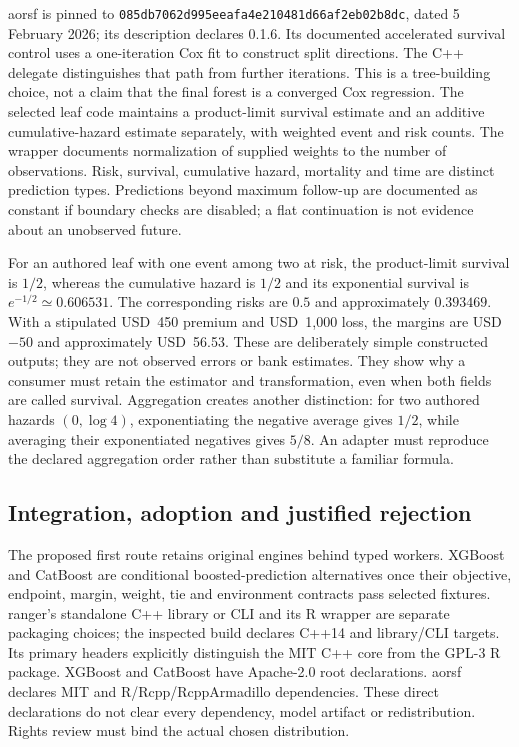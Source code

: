 aorsf is pinned to
\texttt{085db7062d995eeafa4e210481d66af2eb02b8dc}, dated 5 February
2026; its description declares 0.1.6. Its documented accelerated survival
control uses a one-iteration Cox fit to construct split directions. The C++
delegate distinguishes that path from further iterations. This is a tree-building
choice, not a claim that the final forest is a converged Cox regression.
The selected leaf code maintains a product-limit survival estimate and an
additive cumulative-hazard estimate separately, with weighted event and risk
counts. The wrapper documents normalization of supplied weights to the number
of observations. Risk, survival, cumulative hazard, mortality and time are
distinct prediction types. Predictions beyond maximum follow-up are documented
as constant if boundary checks are disabled; a flat continuation is not evidence
about an unobserved future.\citep{exec24_longcxx_aorsf}

For an authored leaf with one event among two at risk, the product-limit
survival is $1/2$, whereas the cumulative hazard is $1/2$ and its exponential
survival is $e^{-1/2}\simeq0.606531$. The corresponding risks are $0.5$ and
approximately $0.393469$. With a stipulated USD~450 premium and USD~1,000 loss,
the margins are USD~$-50$ and approximately USD~56.53. These are deliberately
simple constructed outputs; they are not observed errors or bank estimates.
They show why a consumer must retain the estimator and transformation, even
when both fields are called survival. Aggregation creates another distinction:
for two authored hazards $(0,\log4)$, exponentiating the negative average gives
$1/2$, while averaging their exponentiated negatives gives $5/8$. An adapter
must reproduce the declared aggregation order rather than substitute a familiar
formula.\citep{exec24_longcxx_reference}

\subsection{Integration, adoption and justified rejection}

The proposed first route retains original engines behind typed workers. XGBoost
and CatBoost are conditional boosted-prediction alternatives once their objective,
endpoint, margin, weight, tie and environment contracts pass selected fixtures.
ranger's standalone C++ library or CLI and its R wrapper are separate packaging
choices; the inspected build declares C++14 and library/CLI targets. Its primary
headers explicitly distinguish the MIT C++ core from the GPL-3 R package.
XGBoost and CatBoost have Apache-2.0 root declarations. aorsf declares MIT and
R/Rcpp/RcppArmadillo dependencies. These direct declarations do not clear every
dependency, model artifact or redistribution. Rights review must bind the actual
chosen distribution.\citep{exec24_longcxx_xgboost,exec24_longcxx_catboost,exec24_longcxx_ranger,exec24_longcxx_aorsf}

